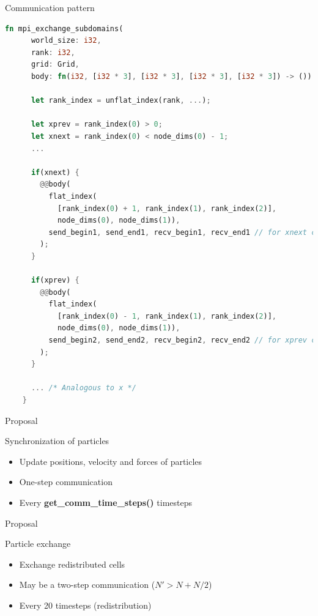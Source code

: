 \documentclass[aspectratio=43,t]{beamer}
\begin{document}
  \begin{frame}[fragile]{Communication pattern}
    \begin{lstlisting}[basicstyle=\tiny\ttfamily,language=Rust]
    fn mpi_exchange_subdomains(
      world_size: i32,
      rank: i32,
      grid: Grid,
      body: fn(i32, [i32 * 3], [i32 * 3], [i32 * 3], [i32 * 3]) -> ()) -> () {

      let rank_index = unflat_index(rank, ...);

      let xprev = rank_index(0) > 0;
      let xnext = rank_index(0) < node_dims(0) - 1;
      ...

      if(xnext) {
        @@body(
          flat_index(
            [rank_index(0) + 1, rank_index(1), rank_index(2)],
            node_dims(0), node_dims(1)),
          send_begin1, send_end1, recv_begin1, recv_end1 // for xnext communication
        );     
      }

      if(xprev) {
        @@body(
          flat_index(
            [rank_index(0) - 1, rank_index(1), rank_index(2)],
            node_dims(0), node_dims(1)),
          send_begin2, send_end2, recv_begin2, recv_end2 // for xprev communication
        );     
      }

      ... /* Analogous to x */
    }
    \end{lstlisting}
  \end{frame}

  \begin{frame}{Proposal}
    \begin{block}{Synchronization of particles}
      \begin{itemize}
        \item Update positions, velocity and forces of particles
        \item One-step communication
        \item Every \textbf{get\_comm\_time\_steps()} timesteps
      \end{itemize}
    \end{block}
  \end{frame}

  \begin{frame}{Proposal}
    \begin{block}{Particle exchange}
      \begin{itemize}
        \item Exchange redistributed cells
        \item May be a two-step communication ($N' > N + N/2$)
        \item Every 20 timesteps (redistribution)
      \end{itemize}
    \end{block}
  \end{frame}
\end{document}

